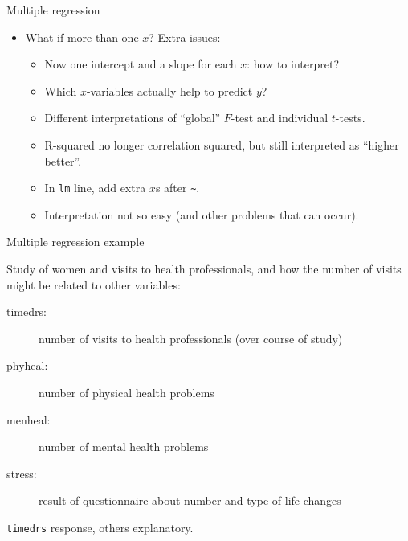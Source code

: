 \documentclass[ignorenonframetext,]{beamer}
\begin{document}
\begin{frame}[fragile]{Multiple regression}
\protect\hypertarget{multiple-regression}{}

\begin{itemize}
\item
  What if more than one \(x\)? Extra issues:

  \begin{itemize}
  \item
    Now one intercept and a slope for each \(x\): how to interpret?
  \item
    Which \(x\)-variables actually help to predict \(y\)?
  \item
    Different interpretations of ``global'' \(F\)-test and individual
    \(t\)-tests.
  \item
    R-squared no longer correlation squared, but still interpreted as
    ``higher better''.
  \item
    In \texttt{lm} line, add extra \(x\)s after
    \texttt{\textasciitilde{}}.
  \item
    Interpretation not so easy (and other problems that can occur).
  \end{itemize}
\end{itemize}

\end{frame}

\begin{frame}[fragile]{Multiple regression example}
\protect\hypertarget{multiple-regression-example}{}

Study of women and visits to health professionals, and how the number of
visits might be related to other variables:

\begin{description}
\item[timedrs:] number of visits to health professionals (over course of study)
\item[phyheal:] number of physical health problems
\item[menheal:] number of mental health problems
\item[stress:] result of questionnaire about number and type of life changes
\end{description}

\texttt{timedrs} response, others explanatory.

\end{frame}
\end{document}
